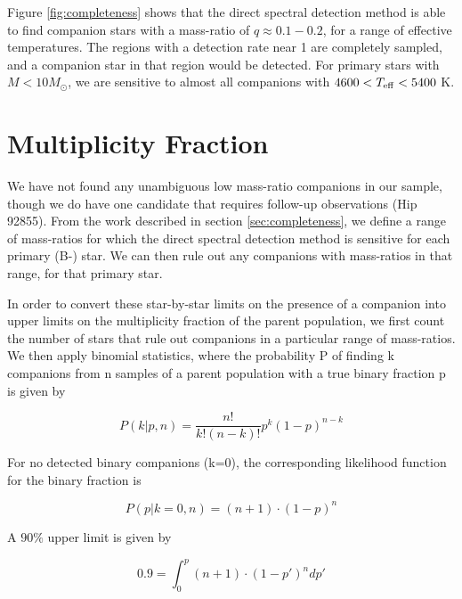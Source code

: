 \documentclass[11pt]{report}     %
\begin{document}
Figure \ref{fig:completeness} shows that the direct spectral detection
method is able to find companion stars with a mass-ratio of $q\approx
0.1-0.2$, for a range of effective temperatures. The regions with a 
detection rate near 1 are completely sampled, and a companion star in 
that region would be detected. For primary stars with $M < 10 M_{\odot}$, we are sensitive to almost all companions with $4600 < T_{\rm eff} < 5400$ K.





\section{Multiplicity Fraction}
\label{sec:multiplicity}

We have not found any unambiguous low mass-ratio companions in our
sample, though we do have one candidate that requires follow-up
observations (Hip 92855). From the work described in section
\ref{sec:completeness}, we define a range
of mass-ratios for which the direct spectral detection method is
sensitive for each primary (B-) star. We can then rule out any
companions with mass-ratios in that range, for that primary star.

In order to convert these star-by-star limits on the presence of a
companion into upper limits on the multiplicity
fraction of the parent population, we first count the number of stars
that rule out companions in a particular range of mass-ratios. We then
apply binomial statistics, where the probability P of finding k
companions from n samples of a parent population with a true binary
fraction p is given by

\begin{equation}
P(k|p,n) = \frac{n!}{k!(n-k)!}p^k(1-p)^{n-k}
\label{eqn:binomial}
\end{equation}

For no detected binary companions (k=0), the corresponding likelihood
function for the binary fraction is

\begin{equation}
P(p|k=0, n) = (n+1)\cdot  (1-p)^n
\label{eqn:likelihood}
\end{equation}

A $90\%$ upper limit is given by

\begin{equation}
0.9 = \int_0^p (n+1)\cdot  (1-p')^n dp'
\label{eqn:limitdef}
\end{equation}
\end{document}
